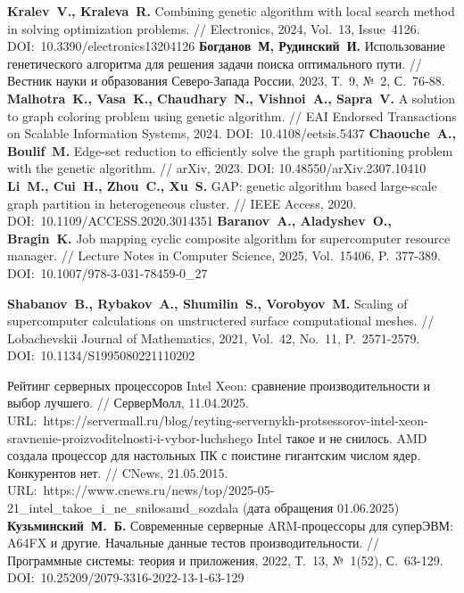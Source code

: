 \begin{thebibliography}{99}
%
\textbf{Kralev~V., Kraleva~R.} Combining genetic algorithm with local search method in solving optimization problems. // Electronics, 2024, Vol.~13, Issue~4126. DOI:~10.3390/electronics13204126
%
\textbf{Богданов~М, Рудинский~И.} Использование генетического алгоритма для решения задачи поиска оптимального пути. // Вестник науки и образования Северо-Запада России, 2023, Т.~9, №~2, С.~76-88.
%
\textbf{Malhotra~K., Vasa~K., Chaudhary~N., Vishnoi~A., Sapra~V.} A solution to graph coloring problem using genetic algorithm. // EAI Endorsed Transactions on Scalable Information Systems, 2024. DOI:~10.4108/eetsis.5437
%
\textbf{Chaouche~A., Boulif~M.} Edge-set reduction to efficiently solve the graph partitioning problem with the genetic algorithm. // arXiv, 2023. DOI: 10.48550/arXiv.2307.10410
%
\textbf{Li~M., Cui~H., Zhou~C., Xu~S.} GAP: genetic algorithm based large-scale graph partition in heterogeneous cluster. // IEEE Access, 2020. DOI:~10.1109/ACCESS.2020.3014351
%
\textbf{Baranov~A., Aladyshev~O., Bragin~K.} Job mapping cyclic composite algorithm for supercomputer resource manager. // Lecture Notes in Computer Science, 2025, Vol.~15406, P.~377-389. DOI:~10.1007/978-3-031-78459-0\_27
%



%
\textbf{Shabanov~B., Rybakov~A., Shumilin~S., Vorobyov~M.} Scaling of supercomputer calculations on unstructered surface computational meshes. // Lobachevskii Journal of Mathematics, 2021, Vol.~42, No.~11, P.~2571-2579. DOI:~10.1134/S1995080221110202
%






%
Рейтинг серверных процессоров Intel Xeon: сравнение производительности и выбор лучшего. // СерверМолл, 11.04.2025. URL:~https://servermall.ru/blog/reyting-servernykh-protsessorov-intel-xeon-sravnenie-proizvoditelnosti-i-vybor-luchshego
%
Intel такое и не снилось. AMD создала процессор для настольных ПК с поистине гигантским числом ядер. Конкурентов нет. // CNews, 21.05.2015. URL:~https://www.cnews.ru/news/top/2025-05-21\_intel\_takoe\_i\_ne\_snilosamd\_sozdala (дата обращения 01.06.2025)
%
\textbf{Кузьминский~М.~Б.} Современные серверные ARM-процессоры для суперЭВМ: A64FX и другие. Начальные данные тестов производительности. // Программные системы: теория и приложения, 2022, Т.~13, №~1(52), С.~63-129. DOI:~10.25209/2079-3316-2022-13-1-63-129
%




\end{thebibliography}
